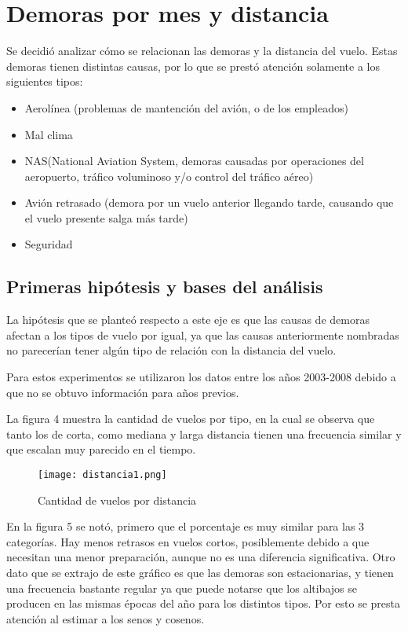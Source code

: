 \section{Demoras por mes y distancia}

Se decidió analizar cómo se relacionan las demoras y la distancia del vuelo. Estas demoras tienen distintas causas, por lo que se prestó atención solamente a los siguientes tipos:
\begin{itemize}
\item Aerolínea (problemas de mantención del avión, o de los empleados)
\item Mal clima
\item NAS(National Aviation System, demoras causadas por operaciones del aeropuerto, tráfico voluminoso y/o control del tráfico aéreo)
\item Avión retrasado (demora por un vuelo anterior llegando tarde, causando que el vuelo presente salga más tarde)
\item Seguridad
\end{itemize}

\subsection{Primeras hipótesis y bases del análisis}

La hipótesis que se planteó respecto a este eje es que las causas de demoras afectan a los tipos de vuelo por igual, ya que las causas anteriormente nombradas no parecerían tener algún tipo de relación con la distancia del vuelo.

Para estos experimentos se utilizaron los datos entre los años 2003-2008 debido a que no se obtuvo información para años previos.

La figura 4 muestra la cantidad de vuelos por tipo, en la cual se observa que tanto los de corta, como mediana y larga distancia tienen una frecuencia similar y que escalan muy parecido en el tiempo.

\begin{figure}[!htb]
\begin{center}
\texttt{[image: distancia1.png]}
\caption{Cantidad de vuelos por distancia}
\label{distancia-1}
\end{center}
\end{figure}

En la figura 5 se notó, primero que el porcentaje es muy similar para las 3 categorías. Hay menos retrasos en vuelos cortos, posiblemente debido a que necesitan una menor preparación, aunque no es una diferencia significativa. Otro dato que se extrajo de este gráfico es que las demoras son estacionarias, y tienen una frecuencia bastante regular ya que puede notarse que los altibajos se producen en las mismas épocas del año para los distintos tipos. Por esto se presta atención al estimar a los senos y cosenos.

